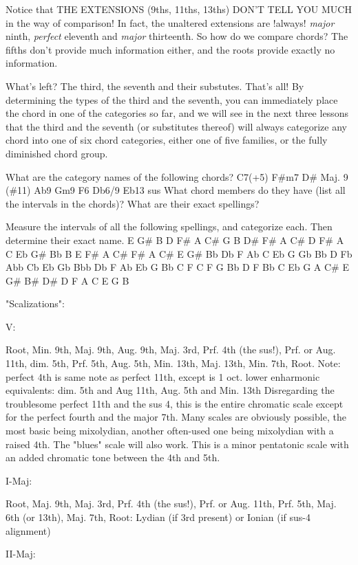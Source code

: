 Notice that THE EXTENSIONS (9ths, 11ths, 13ths) DON'T TELL YOU MUCH in the way
of comparison! In fact, the unaltered extensions are !always! \emph{major} ninth,
\emph{perfect} eleventh and \emph{major} thirteenth. So how do we compare chords? The
fifths don't provide much information either, and the roots provide exactly no
information. 

What's left? The third, the seventh and their substutes. That's all! By
determining the types of the third and the seventh, you can immediately
place the chord in one of the categories so far, and we will see in the
next three lessons that the third and the seventh (or substitutes
thereof) will always categorize any chord into one of six chord
categories, either one of five families, or the fully diminished chord
group.  

What are the category names of the following chords?
C7(+5) F\#m7 D\# Maj. 9 (\#11) Ab9 Gm9 F6 Db6/9 Eb13 sus
What chord members do they have (list all the intervals in the chords)?
What are their exact spellings?

Measure the intervals of all the following spellings, and categorize each.
Then determine their exact name.
E G\# B D F\# A C\#
G B D\# F\# A C\#
D F\# A C Eb G\# Bb
B E F\# A C\#
F\# A C\# E G\#
Bb Db F Ab C Eb G
Gb Bb D Fb Abb
Cb Eb Gb Bbb Db F Ab
Eb G Bb C F
C F G Bb D
F Bb C Eb G
A C\# E G\# B\# D\#
D F A C E G B

"Scalizations":

V:

Root, Min. 9th, Maj. 9th, Aug. 9th, Maj. 3rd, Prf. 4th (the sus!), 
Prf. or Aug. 11th, dim. 5th, Prf. 5th, Aug. 5th, Min. 13th, Maj. 13th,
Min. 7th, Root.
Note: perfect 4th is same note as perfect 11th, except is 1 oct. lower
      enharmonic equivalents: dim. 5th and Aug 11th, 
                              Aug. 5th and Min. 13th
Disregarding the troublesome perfect 11th and the sus 4, this is the
entire chromatic scale except for the perfect fourth and the 
major 7th. Many scales are obviously possible, the most basic being 
mixolydian, another often-used one being mixolydian with a raised 4th.
The "blues" scale will also work. This is a minor pentatonic scale with 
an added chromatic tone between the 4th and 5th.

I-Maj:

Root, Maj. 9th, Maj. 3rd, Prf. 4th (the sus!), Prf. or Aug. 11th,
Prf. 5th, Maj. 6th (or 13th), Maj. 7th, Root:
Lydian (if 3rd present) or Ionian (if sus-4 alignment)

II-Maj:

